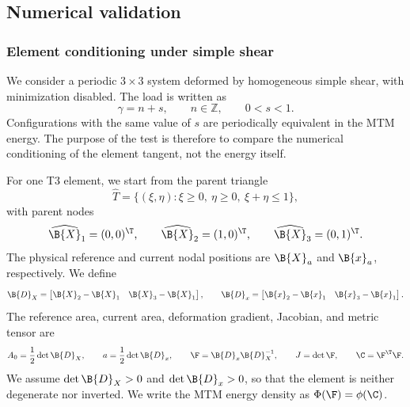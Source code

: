   \subsection{Numerical validation}
  \label{sec:ReMTMValidation}

\subsubsection{Element conditioning under simple shear}
\label{sec:reconnecting_element_conditioning}

We consider a periodic $3\times3$ system deformed by homogeneous simple shear,
with minimization disabled. The load is written as
\begin{equation}
    \gamma = n+s,
    \qquad
    n\in\mathbb{Z},
    \qquad
    0<s<1 .
\end{equation}
Configurations with the same value of $s$ are periodically equivalent in the
MTM energy. The purpose of the test is therefore to compare the numerical
conditioning of the element tangent, not the energy itself.

For one T3 element, we start from the parent triangle
\begin{equation}
    \widehat{T}
    =
    \{(\xi,\eta):\xi\geq0,\ \eta\geq0,\ \xi+\eta\leq1\},
\end{equation}
with parent nodes
\begin{equation}
    \widehat{\B{X}}_1=(0,0)^\T,
    \qquad
    \widehat{\B{X}}_2=(1,0)^\T,
    \qquad
    \widehat{\B{X}}_3=(0,1)^\T .
\end{equation}
The physical reference and current nodal positions are $\B{X}_a$ and
$\B{x}_a$, respectively. We define
\begin{equation}
    \B{D}_X =
    \begin{bmatrix}
        \B{X}_2-\B{X}_1 & \B{X}_3-\B{X}_1
    \end{bmatrix},
    \qquad
    \B{D}_x =
    \begin{bmatrix}
        \B{x}_2-\B{x}_1 & \B{x}_3-\B{x}_1
    \end{bmatrix}.
\end{equation}
The reference area, current area, deformation gradient, Jacobian, and metric
tensor are
\begin{equation}
    A_0 = \frac{1}{2}\det\B{D}_X,
    \qquad
    a = \frac{1}{2}\det\B{D}_x,
    \qquad
    \F = \B{D}_x \B{D}_X^{-1},
    \qquad
    J=\det\F,
    \qquad
    \C = \F^\T\F .
\end{equation}
We assume $\det\B{D}_X>0$ and $\det\B{D}_x>0$, so that the element is neither
degenerate nor inverted. We write the MTM energy density as
$\Phi(\F)=\phi(\C)$.

